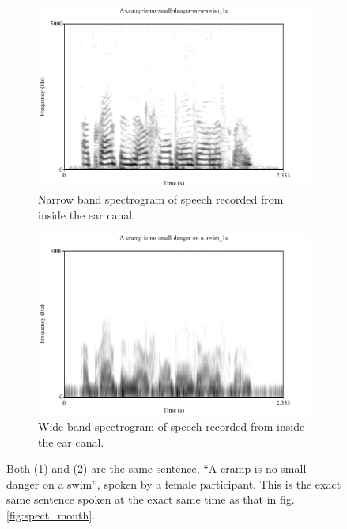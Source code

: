 \documentclass[dissertation,copyright]{uathesis}
\begin{document}
\begin{figure}[b!]
\centering
\begin{subfigure}{0.475\textwidth}
  \centering
  \includegraphics[width=1\linewidth]{figure/spctgrmNarrowEar_35.pdf}
  \caption{Narrow band spectrogram of speech recorded from inside the ear canal.}
  \label{spctgrmNarrowEar_35}
\end{subfigure}%
\hfill
\begin{subfigure}{0.475\textwidth}
  \centering
  \includegraphics[width=1\linewidth]{figure/spctgrmWideEar_35.pdf}
  \caption{Wide band spectrogram of speech recorded from inside the ear canal.}
  \label{spctgrmWideEar_35}
\end{subfigure}
\caption{Both (\ref{spctgrmNarrowEar_35}) and (\ref{spctgrmWideEar_35}) are the same sentence, ``A cramp is no small danger on a swim'', spoken by a female participant. This is the exact same sentence spoken at the exact same time as that in fig. \ref{fig:spect_mouth}.}
\label{fig:spect_ear}
\end{figure}
\end{document}
